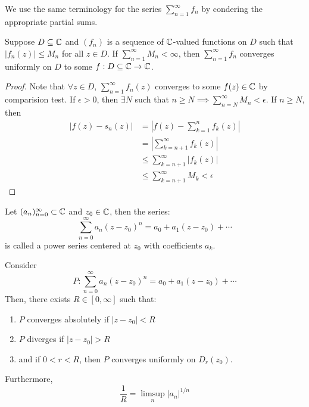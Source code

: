 \documentclass[12pt]{amsart}
\begin{document}
We use the same terminology for the series $\sum_{n=1}^\infty f_n$ by condering the appropriate partial sums. 

\begin{theorem}
    Suppose $D \subseteq \mathbb C$ and $(f_n)$ is a sequence of $\mathbb C$-valued functions on $D$ such that $|f_n(z)| \leq M_n$ for all $z \in D$. If $\sum_{n=1}^\infty M_n < \infty$, then $\sum_{n=1}^\infty f_n$ converges uniformly on $D$ to some $f: D \subseteq \mathbb C \to \mathbb C$. 
\end{theorem}

\begin{proof}
    Note that $\forall z \in D$, $\sum_{n=1}^\infty f_n(z)$ converges to some $f(z) \in \mathbb C$ by comparision test. If $\epsilon > 0$, then $\exists N$ such that $n \geq N \implies \sum_{n=N}^\infty M_n < \epsilon$. If $n \geq N$, then
    \begin{align*}
        |f(z) - s_n(z)| &= |f(z) - \sum_{k=1}^n f_k(z)| \\
        &= \left|\sum_{k = n+1}^\infty f_k(z)\right| \\
        &\leq \sum_{k=n+1}^\infty |f_k(z)| \\
        &\leq \sum_{k=n+1}^\infty M_k < \epsilon
    \end{align*}
\end{proof}

\begin{definition}
    Let $(a_n)_{n=0}^\infty \subset \mathbb C$ and $z_0 \in \mathbb C$, then the series: 
    \[ \sum_{n=0}^\infty a_n(z-z_0)^n = a_0 + a_1(z-z_0) + \cdots \]
    is called a power series centered at $z_0$ with coefficients $a_k$. 
\end{definition}

\begin{theorem}[W 1.34]
    Consider  
    \[ P : \sum_{n=0}^\infty a_n(z-z_0)^n = a_0 + a_1(z-z_0) + \cdots \]
    Then, there exists $R \in [0, \infty]$ such that: 
    \begin{enumerate}
        \item $P$ converges absolutely if $|z-z_0| < R$
        \item $P$ diverges if $|z-z_0| > R$
        \item and if $0 < r < R$, then $P$ converges uniformly on $D_r(z_0)$. 
    \end{enumerate}
    Furthermore,
    \[ \frac{1}{R} = \limsup_n|a_n|^{1/n} \]
\end{theorem}
\end{document}

